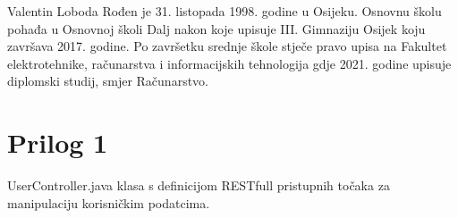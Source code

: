 \documentclass[a4paper,12pt,oneside]{article}
\begin{document}
Valentin Loboda Rođen je 31. listopada 1998. godine u Osijeku. Osnovnu školu pohađa u 
Osnovnoj školi Dalj nakon koje upisuje III. Gimnaziju Osijek koju završava 2017. godine. Po 
završetku srednje škole stječe pravo upisa na Fakultet elektrotehnike, računarstva i informacijskih 
tehnologija gdje 2021. godine upisuje diplomski studij, smjer Računarstvo.





\newpage
\section*{Prilog 1}
\label{prilog 1}
UserController.java klasa s definicijom RESTfull pristupnih točaka za manipulaciju korisničkim podatcima.
\end{document}
